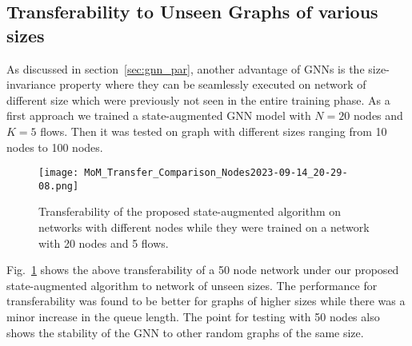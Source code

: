 \documentclass[lettersize,journal]{IEEEtran}
\begin{document}
\subsection{Transferability to Unseen Graphs of various sizes}
As discussed in section~\ref{sec:gnn_par}, another advantage of GNNs is the size-invariance property where they can be seamlessly executed on network of different size which were previously not seen in the entire training phase. As a first approach we trained a state-augmented GNN model with $N=20$ nodes and $K=5$ flows. Then it was tested on graph with different sizes ranging from 10 nodes to 100 nodes.
\begin{figure}[h]%
    \centering   
    \texttt{[image: MoM\_Transfer\_Comparison\_Nodes2023-09-14\_20-29-08.png]}
    \caption{Transferability of the proposed state-augmented algorithm on networks with different nodes while they were trained on a network with 20 nodes and 5 flows.}
    \label{Fig:transfer_nodes}
\end{figure}
Fig.~\ref{Fig:transfer_nodes} shows the above transferability of a 50 node network under our proposed state-augmented algorithm to network of unseen sizes. The performance for transferability was found to be better for graphs of higher sizes while there was a minor increase in the queue length. The point for testing with 50 nodes also shows the stability of the GNN to other random graphs of the same size.
\end{document}
